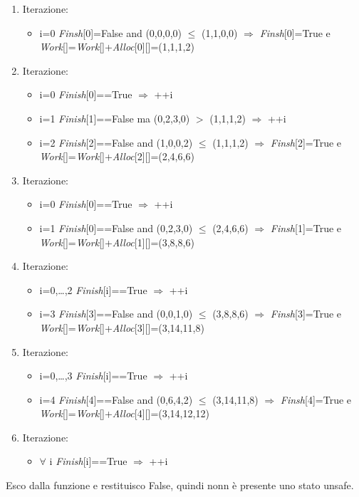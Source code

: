\documentclass{article}
\begin{document}
    \begin{enumerate}
        \item Iterazione:
            \begin{itemize}
                \item i=0 \emph{Finsh}[0]=False and (0,0,0,0) $\le$ (1,1,0,0) $\Rightarrow$ \emph{Finsh}[0]=True e \emph{Work}[]=\emph{Work}[]+\emph{Alloc}[0][]=(1,1,1,2)
            \end{itemize}
        \item Iterazione:
            \begin{itemize}
                \item i=0 \emph{Finish}[0]==True $\Rightarrow$ ++i
                \item i=1 \emph{Finish}[1]==False ma (0,2,3,0) $>$ (1,1,1,2) $\Rightarrow$ ++i
                \item i=2 \emph{Finish}[2]==False and (1,0,0,2) $\le$ (1,1,1,2) $\Rightarrow$ \emph{Finsh}[2]=True e \emph{Work}[]=\emph{Work}[]+\emph{Alloc}[2][]=(2,4,6,6)
            \end{itemize}
        \item Iterazione:
            \begin{itemize}
                \item i=0 \emph{Finish}[0]==True $\Rightarrow$ ++i
                \item i=1 \emph{Finish}[0]==False and (0,2,3,0) $\le$ (2,4,6,6) $\Rightarrow$ \emph{Finsh}[1]=True e \emph{Work}[]=\emph{Work}[]+\emph{Alloc}[1][]=(3,8,8,6)
            \end{itemize}
        \item Iterazione:
            \begin{itemize}
                \item i=0,\dots,2 \emph{Finish}[i]==True $\Rightarrow$ ++i
                \item i=3 \emph{Finish}[3]==False and (0,0,1,0) $\le$ (3,8,8,6) $\Rightarrow$ \emph{Finsh}[3]=True e \emph{Work}[]=\emph{Work}[]+\emph{Alloc}[3][]=(3,14,11,8)
            \end{itemize}
        \item Iterazione:
            \begin{itemize}
                \item i=0,\dots,3 \emph{Finish}[i]==True $\Rightarrow$ ++i
                \item i=4 \emph{Finish}[4]==False and (0,6,4,2) $\le$ (3,14,11,8) $\Rightarrow$ \emph{Finsh}[4]=True e \emph{Work}[]=\emph{Work}[]+\emph{Alloc}[4][]=(3,14,12,12)
            \end{itemize}
        \item Iterazione:
            \begin{itemize}
                \item $\forall$ i \emph{Finish}[i]==True $\Rightarrow$ ++i
            \end{itemize}
    \end{enumerate}
    Esco dalla funzione e restituisco False, quindi nonn è presente uno stato unsafe.
\end{document}
